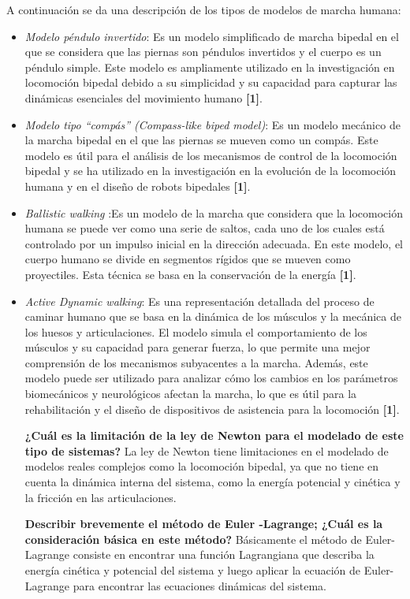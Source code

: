 \documentclass[journal,transmag]{IEEEtran}
\begin{document}
	A continuación se da una descripción de los tipos de modelos de marcha humana:
	 \begin{itemize}
    \item \textit{Modelo péndulo invertido}: Es un modelo simplificado de marcha bipedal en el que se considera que las piernas son péndulos invertidos y el cuerpo es un péndulo simple. Este modelo es ampliamente utilizado en la investigación en locomoción bipedal debido a su simplicidad y su capacidad para capturar las dinámicas esenciales del movimiento humano \textbf{[1]}.
    \item \textit{Modelo tipo “compás” (Compass-like biped model)}: Es un modelo mecánico de la marcha bipedal en el que las piernas se mueven como un compás. Este modelo es útil para el análisis de los mecanismos de control de la locomoción bipedal y se ha utilizado en la investigación en la evolución de la locomoción humana y en el diseño de robots bipedales \textbf{[1]}.
    \item \textit{Ballistic walking} :Es un modelo de la marcha que considera que la locomoción humana se puede ver como una serie de saltos, cada uno de los cuales está controlado por un impulso inicial en la dirección adecuada. En este modelo, el cuerpo humano se divide en segmentos rígidos que se mueven como proyectiles. Esta técnica se basa en la conservación de la energía \textbf{[1]}.
    \item \textit{Active Dynamic walking}: Es una representación detallada del proceso de caminar humano que se basa en la dinámica de los músculos y la mecánica de los huesos y articulaciones. El modelo simula el comportamiento de los músculos y su capacidad para generar fuerza, lo que permite una mejor comprensión de los mecanismos subyacentes a la marcha. Además, este modelo puede ser utilizado para analizar cómo los cambios en los parámetros biomecánicos y neurológicos afectan la marcha, lo que es útil para la rehabilitación y el diseño de dispositivos de asistencia para la locomoción \textbf{[1]}.


    \textbf{¿Cuál es la limitación de la ley de Newton para el modelado de este tipo de sistemas?}
    La ley de Newton tiene limitaciones en el modelado de modelos reales complejos como la locomoción bipedal, ya que no tiene en cuenta la dinámica interna del sistema, como la energía potencial y cinética y la fricción en las articulaciones. 

    \textbf{Describir brevemente el método de Euler -Lagrange; ¿Cuál es la consideración básica en este método?} Básicamente el método de Euler-Lagrange consiste en encontrar una función Lagrangiana que describa la energía cinética y potencial del sistema y luego aplicar la ecuación de Euler-Lagrange para encontrar las ecuaciones dinámicas del sistema. 


\end{itemize}
\end{document}
